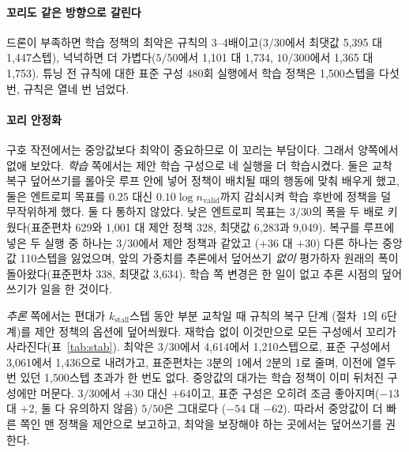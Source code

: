 \documentclass[final,5p,times,twocolumn]{elsarticle}
\begin{document}
\paragraph{꼬리도 같은 방향으로 갈린다}
드론이 부족하면 학습 정책의 최악은 규칙의 3--4배이고($3/30$에서 최댓값 5{,}395 대
1{,}447스텝), 넉넉하면 더 가볍다($5/50$에서 1{,}101 대 1{,}734, $10/300$에서 1{,}365 대 1{,}753).
튜닝 전 규칙에 대한 표준 구성 480회 실행에서 학습 정책은 1{,}500스텝을 다섯 번, 규칙은 열네
번 넘었다.

\paragraph{꼬리 안정화}
구호 작전에서는 중앙값보다 최악이 중요하므로 이 꼬리는 부담이다. 그래서 양쪽에서 없애 보았다.
\emph{학습} 쪽에서는 제안 학습 구성으로 네 실행을 더 학습시켰다. 둘은 교착 복구 덮어쓰기를 롤아웃
루프 안에 넣어 정책이 배치될 때의 행동에 맞춰 배우게 했고, 둘은 엔트로피 목표를 $0.25$ 대신
$0.10 \log n_{\mathrm{valid}}$까지 감쇠시켜 학습 후반에 정책을 덜 무작위하게 했다. 둘 다 통하지
않았다. 낮은 엔트로피 목표는 $3/30$의 폭을 두 배로 키웠다(표준편차 629와 1{,}001 대 제안 정책 328,
최댓값 6{,}283과 9{,}049). 복구를 루프에 넣은 두 실행 중 하나는 $3/30$에서 제안 정책과 같았고
($+36$ 대 $+30$) 다른 하나는 중앙값 110스텝을 잃었으며, 앞의 가중치를 추론에서 덮어쓰기 \emph{없이}
평가하자 원래의 폭이 돌아왔다(표준편차 338, 최댓값 3{,}634). 학습 쪽 변경은 한 일이 없고 추론 시점의
덮어쓰기가 일을 한 것이다.

\emph{추론} 쪽에서는 편대가 $k_{\mathrm{stall}}$스텝 동안 부분 교착일 때 규칙의 복구 단계
(절차~1의 6단계)를 제안 정책의 옵션에 덮어씌웠다. 재학습 없이 이것만으로 모든 구성에서 꼬리가
사라진다(표~\ref{tab:stab}). 최악은 $3/30$에서 4{,}614에서 1{,}210스텝으로, 표준 구성에서 3{,}061에서
1{,}436으로 내려가고, 표준편차는 3분의 1에서 2분의 1로 줄며, 이전에 열두 번 있던 1{,}500스텝 초과가
한 번도 없다. 중앙값의 대가는 학습 정책이 이미 뒤처진 구성에만 머문다. $3/30$에서 $+30$ 대신
$+64$이고, 표준 구성은 오히려 조금 좋아지며($-13$ 대 $+2$, 둘 다 유의하지 않음) $5/50$은 그대로다
($-54$ 대 $-62$). 따라서 중앙값이 더 빠른 쪽인 맨 정책을 제안으로 보고하고, 최악을 보장해야 하는
곳에서는 덮어쓰기를 권한다.

\begin{table}[t]
\centering
\caption{제안 정책에 추론 시점에서 교착 복구 덮어쓰기를 씌운 효과, 재학습 없음. 쌍별 중앙값과
승--패, $p$는 같은 인스턴스에서 튜닝된 규칙에 대한 것이고, 표준편차·90분위·최대·1{,}500스텝
초과 횟수는 학습 정책 자신의 makespan 분포다.}
\label{tab:stab}
\small

\end{table}
\end{document}

